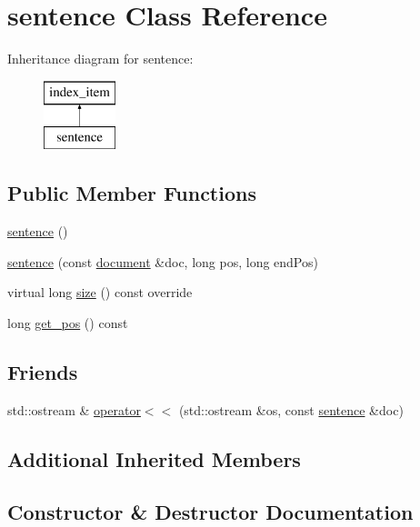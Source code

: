 \hypertarget{classsentence}{}\section{sentence Class Reference}
\label{classsentence}
Inheritance diagram for sentence\+:\begin{figure}[H]
\begin{center}
\leavevmode
\includegraphics[height=2.000000cm]{classsentence}
\end{center}
\end{figure}
\subsection*{Public Member Functions}
\begin{DoxyCompactItemize}
\item 
\hyperlink{classsentence_a458e5abe0d27f8972771153e72667673}{sentence} ()
\item 
\hyperlink{classsentence_ade30f24b62f56cf53fd38d0fb541082c}{sentence} (const \hyperlink{classdocument}{document} \&doc, long pos, long end\+Pos)
\item 
virtual long \hyperlink{classsentence_ad673d4210850083f621383e2629a7b0e}{size} () const override
\item 
long \hyperlink{classsentence_a033a9fd50b254e87d5303a23b2f02295}{get\+\_\+pos} () const
\end{DoxyCompactItemize}
\subsection*{Friends}
\begin{DoxyCompactItemize}
\item 
std\+::ostream \& \hyperlink{classsentence_a75f010f233216c95ebc86aa5e5675574}{operator$<$$<$} (std\+::ostream \&os, const \hyperlink{classsentence}{sentence} \&doc)
\end{DoxyCompactItemize}
\subsection*{Additional Inherited Members}


\subsection{Constructor \& Destructor Documentation}
\mbox{\label{classsentence_a458e5abe0d27f8972771153e72667673}} 
